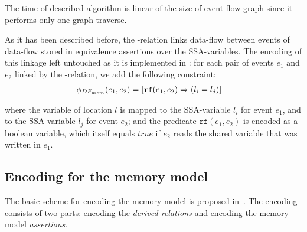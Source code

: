 The time of described algorithm is linear of the size of event-flow graph since it performs only one graph traverse.

As it has been described before, the \rf-relation links data-flow between events %
of data-flow stored in equivalence assertions over the SSA-variables. 
The encoding of this linkage left untouched as it is implemented in \porthos: for each pair of events $e_1$ and $e_2$ linked by the \rf-relation, we add the following constraint:
%
\begin{align}
\phi_{DF_{mem}}(e_1, e_2) = \ & [\texttt{rf}(e_1, e_2) \Rightarrow (l_i = l_j)]
\end{align}

where the variable of location $l$ is mapped to the SSA-variable $l_i$ for event $e_1$, and to the SSA-variable $l_j$ for event $e_2$; and the predicate $\texttt{rf}(e_1, e_2)$ is encoded as a boolean variable, which itself equals $true$ if $e_2$ reads the shared variable that was written in $e_1$.


\subsection{Encoding for the memory model} %
\label{ch:enc:bmc:wmm}

The basic scheme for encoding the memory model is proposed in~\cite{Porthos17a}.
The encoding consists of two parts: encoding the \textit{derived relations} and encoding the memory model \textit{assertions}.

